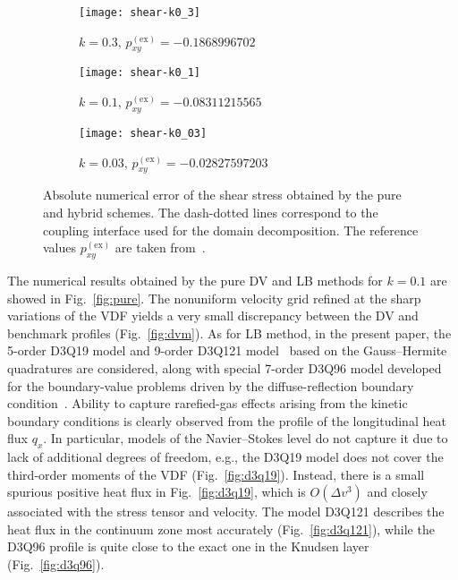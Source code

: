 \documentclass{elsarticle} %
\newcommand{\OO}[1]{O(#1)}
\begin{document}
\begin{figure}
    \centering
    \begin{subfigure}[b]{0.33\textwidth}
        \texttt{[image: shear-k0\_3]}
        \caption{\(k=0.3\), \(p^\mathrm{(ex)}_{xy} = -0.1868996702\)}
        \label{fig:accuracy-k0_3}
    \end{subfigure}%
    \begin{subfigure}[b]{0.33\textwidth}
        \texttt{[image: shear-k0\_1]}
        \caption{\(k=0.1\), \(p^\mathrm{(ex)}_{xy} = -0.08311215565\)}
        \label{fig:accuracy-k0_1}
    \end{subfigure}%
    \begin{subfigure}[b]{0.33\textwidth}
        \texttt{[image: shear-k0\_03]}
        \caption{\(k=0.03\), \(p^\mathrm{(ex)}_{xy} = -0.02827597203\)}
        \label{fig:accuracy-k0_03}
    \end{subfigure}
    \caption{
        Absolute numerical error of the shear stress obtained by the pure and hybrid schemes.
        The dash-dotted lines correspond to the coupling interface used for the domain decomposition.
        The reference values \(p^\mathrm{(ex)}_{xy}\) are taken from~\cite{Luo2016}.
    }\label{fig:accuracy}
\end{figure}

The numerical results obtained by the pure DV and LB methods for \(k=0.1\) are showed in Fig.~\ref{fig:pure}.
The nonuniform velocity grid refined at the sharp variations of the VDF
yields a very small discrepancy between the DV and benchmark profiles (Fig.~\ref{fig:dvm}).
As for LB method, in the present paper, the 5-order D3Q19 model and 9-order D3Q121 model~\cite{Shan2010}
based on the Gauss--Hermite quadratures are considered, along with special 7-order D3Q96 model
developed for the boundary-value problems driven by the diffuse-reflection boundary condition~\cite{Feuchter2016}.
Ability to capture rarefied-gas effects arising from the kinetic boundary conditions
is clearly observed from the profile of the longitudinal heat flux \(q_x\).
In particular, models of the Navier--Stokes level do not capture it due to lack of additional degrees of freedom,
e.g., the D3Q19 model does not cover the third-order moments of the VDF (Fig.~\ref{fig:d3q19}).
Instead, there is a small spurious positive heat flux in Fig.~\ref{fig:d3q19},
which is \(\OO{\Delta v^3}\) and closely associated with the stress tensor and velocity.
The model D3Q121 describes the heat flux in the continuum zone most accurately (Fig.~\ref{fig:d3q121}),
while the D3Q96 profile is quite close to the exact one in the Knudsen layer (Fig.~\ref{fig:d3q96}).
\end{document}
